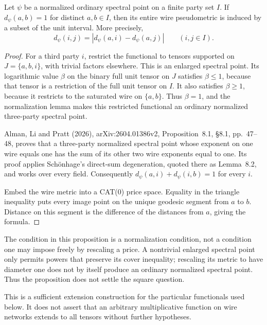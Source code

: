 \begin{proposition}
\label{pg:edge-rigidity}
Let $\psi$ be a normalized ordinary spectral point on a finite party set
$I$. If $d_\psi(a,b)=1$ for distinct $a,b\in I$, then its entire wire
pseudometric is induced by a subset of the unit interval. More precisely,
\[
 d_\psi(i,j)=|d_\psi(a,i)-d_\psi(a,j)|\qquad(i,j\in I).
\]
\end{proposition}
\begin{proof}
For a third party $i$, restrict the functional to tensors supported on
$J=\{a,b,i\}$, with trivial factors elsewhere. This is an enlarged
spectral point. Its logarithmic value $\beta$ on the binary full unit
tensor on $J$ satisfies $\beta\leq1$, because that tensor is a restriction
of the full unit tensor on $I$. It also satisfies $\beta\geq1$, because
it restricts to the saturated wire on $\{a,b\}$. Thus $\beta=1$, and the
normalization lemma makes this restricted functional an ordinary
normalized three-party spectral point.

Alman, Li and Pratt (2026), arXiv:2604.01386v2, Proposition~8.1,
\S8.1, pp.~47--48, proves that a three-party normalized spectral point
whose exponent on one wire equals one has the sum of its other two wire
exponents equal to one. Its proof applies Sch\"onhage's direct-sum
degeneration, quoted there as Lemma~8.2, and works over every field.
Consequently $d_\psi(a,i)+d_\psi(i,b)=1$ for every $i$.

Embed the wire metric into a CAT(0) price space. Equality in the triangle
inequality puts every image point on the unique geodesic segment from
$a$ to $b$. Distance on this segment is the difference of the distances
from $a$, giving the formula.
\end{proof}

The condition in this proposition is a normalization condition, not a
condition one may impose freely by rescaling a price. A nontrivial enlarged
spectral point only permits powers that preserve its cover inequality;
rescaling its metric to have diameter one does not by itself produce an
ordinary normalized spectral point. Thus the proposition does not settle
the square question.

This is a sufficient extension construction for the particular functionals
used below. It does not assert that an arbitrary multiplicative function on
wire networks extends to all tensors without further hypotheses.

